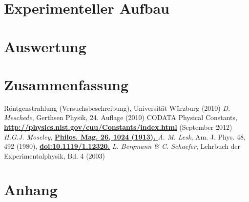 \documentclass[paper=a4,fontsize=10pt,DIV=18,twocolumn,parskip=half]{scrartcl}
\numberwithin{equation}{section}    %
\begin{document}
\section{Experimenteller Aufbau}
%

\label{Experiment}
%
\section{Auswertung}
%






%
\section{Zusammenfassung}
%

%
\begin{thebibliography}{}   
%
%
   Röntgenstrahlung  (Versuchsbeschreibung), Universität Würzburg
  (2010) 
   \textit{D. Meschede}, Gerthsen Physik, 24. Auflage (2010) 
   CODATA Physical Constants,
    \textbf{\url{http://physics.nist.gov/cuu/Constants/index.html}} 
    (September 2012)
   \textit{H.G.J. Moseley},
  \href{http://www.chemistry.co.nz/henry_moseley_article.htm}{\textbf{{Philos.
        Mag. 26, 1024 (1913).  }}} 
   \textit{A. M. Lesk}, Am. J. Phys. 48, 492 (1980),
    \href{http://ajp.aapt.org/resource/1/ajpias/v48/i6/p492_s1?ver=pdfcov}
    {\textbf{doi:10.1119/1.12320.}}
     \textit{L. Bergmann \& C. Schaefer}, Lehrbuch der
    Experimentalphysik, Bd. 4 (2003)
\end{thebibliography}
%
%
\onecolumn
\pagestyle{empty}
\section{Anhang}
\label{Anhang}
\end{document}
